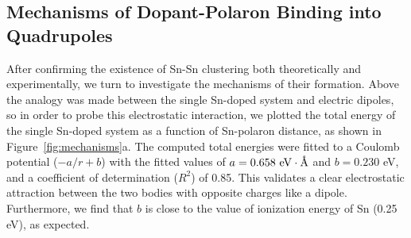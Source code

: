 \subsection{Mechanisms of Dopant-Polaron Binding into Quadrupoles}
%

After confirming the existence of Sn-Sn clustering both theoretically and experimentally, we turn to investigate the mechanisms of their formation.
Above the analogy was made between the single Sn-doped system and electric dipoles,
so in order to probe this electrostatic interaction, we plotted the total energy of the single Sn-doped system as a function of Sn-polaron distance, as shown in Figure~\ref{fig:mechanisms}a.
The computed total energies were fitted to a Coulomb potential ($-a/r+b$) with the fitted values of $a=0.658\ {\rm eV\cdot\text{\AA}}$ and $b=0.230$ eV, and a coefficient of determination ($R^2$) of 0.85.
This validates a clear electrostatic attraction between the two bodies with opposite charges like a dipole.
Furthermore, we find that $b$ is close to the value of ionization energy of Sn (0.25 eV), as expected.

